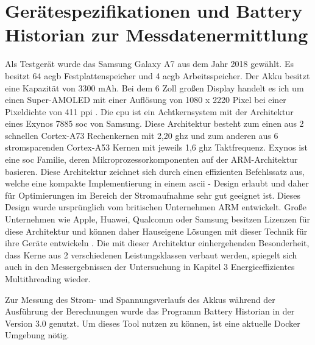 \section{Gerätespezifikationen und Battery Historian zur Messdatenermittlung}

Als Testgerät wurde das Samsung Galaxy A7 aus dem Jahr 2018 gewählt. Es besitzt 64 ac{gb} Festplattenspeicher und 4 ac{gb} Arbeitsspeicher. Der Akku besitzt eine Kapazität von 3300 \ac{mAh}. Bei dem 6 Zoll großen Display handelt es ich um einen Super-AMOLED mit einer Auflösung von 1080 x 2220 Pixel bei einer Pixeldichte von 411 \ac{ppi} \cite{smartphone-data}. Die \ac{cpu} ist ein Achtkernsystem mit der Architektur eines Exynos 7885 \ac{soc} von Samsung.  Diese Architektur besteht zum einen aus 2 schnellen Cortex-A73 Rechenkernen mit 2,20 \ac{ghz} und zum anderen aus 6 stromsparenden Cortex-A53 Kernen mit jeweils 1,6 \ac{ghz} Taktfrequenz. Exynos ist eine \ac{soc} Familie, deren Mikroprozessorkomponenten auf der ARM-Architektur basieren. Diese Architektur zeichnet sich durch einen effizienten Befehlssatz aus, welche eine kompakte Implementierung in einem \ac{ascii} - Design erlaubt und daher für Optimierungen im Bereich der Stromaufnahme sehr gut geeignet ist. Dieses Design wurde ursprünglich vom britischen Unternehmen ARM entwickelt. Große Unternehmen wie Apple, Huawei, Qualcomm oder Samsung besitzen Lizenzen für diese Architektur und können daher Hauseigene Lösungen mit dieser Technik für ihre Geräte entwickeln \cite{cpu-data}. Die mit dieser Architektur einhergehenden Besonderheit, dass Kerne aus 2 verschiedenen Leistungsklassen verbaut werden, spiegelt sich auch in den Messergebnissen der Untersuchung in Kapitel 3 \glqq Energieeffizientes Multithreading\grqq{} wieder.

Zur Messung des Strom- und Spannungsverlaufs des Akkus während der Ausführung der Berechnungen wurde das Programm Battery Historian in der Version 3.0 genutzt. Um dieses Tool nutzen zu können, ist eine aktuelle Docker Umgebung nötig. 

